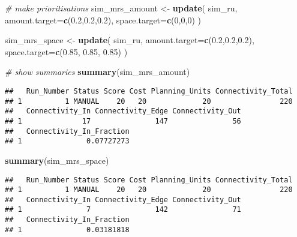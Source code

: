 \documentclass[11pt,]{article}
\newenvironment{Shaded}{\begin{snugshade}}{\end{snugshade}}
\newcommand{\KeywordTok}[1]{\textcolor[rgb]{0.13,0.29,0.53}{\textbf{{#1}}}}
\newcommand{\DataTypeTok}[1]{\textcolor[rgb]{0.13,0.29,0.53}{{#1}}}
\newcommand{\DecValTok}[1]{\textcolor[rgb]{0.00,0.00,0.81}{{#1}}}
\newcommand{\FloatTok}[1]{\textcolor[rgb]{0.00,0.00,0.81}{{#1}}}
\newcommand{\StringTok}[1]{\textcolor[rgb]{0.31,0.60,0.02}{{#1}}}
\newcommand{\CommentTok}[1]{\textcolor[rgb]{0.56,0.35,0.01}{\textit{{#1}}}}
\newcommand{\NormalTok}[1]{{#1}}
\begin{document}
\begin{Shaded}
\begin{Highlighting}[]
\CommentTok{# make prioritisations}
\NormalTok{sim_mrs_amount <-}\StringTok{ }\KeywordTok{update}\NormalTok{(}
    \NormalTok{sim_ru,}
    \DataTypeTok{amount.target=}\KeywordTok{c}\NormalTok{(}\FloatTok{0.2}\NormalTok{,}\FloatTok{0.2}\NormalTok{,}\FloatTok{0.2}\NormalTok{),}
    \DataTypeTok{space.target=}\KeywordTok{c}\NormalTok{(}\DecValTok{0}\NormalTok{,}\DecValTok{0}\NormalTok{,}\DecValTok{0}\NormalTok{)}
\NormalTok{)}

\NormalTok{sim_mrs_space <-}\StringTok{ }\KeywordTok{update}\NormalTok{(}
    \NormalTok{sim_ru,}
    \DataTypeTok{amount.target=}\KeywordTok{c}\NormalTok{(}\FloatTok{0.2}\NormalTok{,}\FloatTok{0.2}\NormalTok{,}\FloatTok{0.2}\NormalTok{),}
    \DataTypeTok{space.target=}\KeywordTok{c}\NormalTok{(}\FloatTok{0.85}\NormalTok{, }\FloatTok{0.85}\NormalTok{, }\FloatTok{0.85}\NormalTok{)}
\NormalTok{)}
\end{Highlighting}
\end{Shaded}

\begin{Shaded}
\begin{Highlighting}[]
\CommentTok{# show summaries}
\KeywordTok{summary}\NormalTok{(sim_mrs_amount)}
\end{Highlighting}
\end{Shaded}

\begin{verbatim}
##   Run_Number Status Score Cost Planning_Units Connectivity_Total
## 1          1 MANUAL    20   20             20                220
##   Connectivity_In Connectivity_Edge Connectivity_Out
## 1              17               147               56
##   Connectivity_In_Fraction
## 1               0.07727273
\end{verbatim}

\begin{Shaded}
\begin{Highlighting}[]
\KeywordTok{summary}\NormalTok{(sim_mrs_space)}
\end{Highlighting}
\end{Shaded}

\begin{verbatim}
##   Run_Number Status Score Cost Planning_Units Connectivity_Total
## 1          1 MANUAL    20   20             20                220
##   Connectivity_In Connectivity_Edge Connectivity_Out
## 1               7               142               71
##   Connectivity_In_Fraction
## 1               0.03181818
\end{verbatim}
\end{document}
